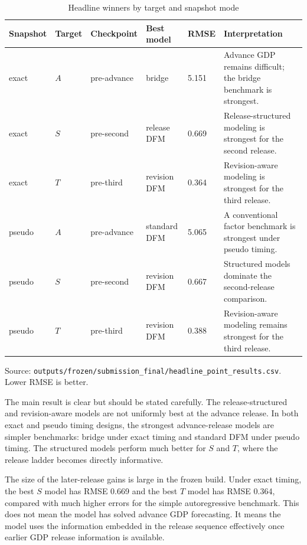 \documentclass[12pt]{article}
\begin{document}
\begin{table}[!htbp]
\centering
\begin{threeparttable}
\caption{Headline winners by target and snapshot mode}
\label{tab:headline}
\small
\begin{tabular}{lllllp{5.2cm}}
\toprule
Snapshot & Target & Checkpoint & Best model & RMSE & Interpretation \\
\midrule
exact & $A$ & pre-advance & bridge & 5.151 & Advance GDP remains difficult; the bridge benchmark is strongest. \\
exact & $S$ & pre-second & release DFM & 0.669 & Release-structured modeling is strongest for the second release. \\
exact & $T$ & pre-third & revision DFM & 0.364 & Revision-aware modeling is strongest for the third release. \\
pseudo & $A$ & pre-advance & standard DFM & 5.065 & A conventional factor benchmark is strongest under pseudo timing. \\
pseudo & $S$ & pre-second & revision DFM & 0.667 & Structured models dominate the second-release comparison. \\
pseudo & $T$ & pre-third & revision DFM & 0.388 & Revision-aware modeling remains strongest for the third release. \\
\bottomrule
\end{tabular}
\begin{tablenotes}
\footnotesize
\item Source: \texttt{outputs/frozen/submission\_final/headline\_point\_results.csv}. Lower RMSE is better.
\end{tablenotes}
\end{threeparttable}
\end{table}

The main result is clear but should be stated carefully. The release-structured and revision-aware models are not uniformly best at the advance release. In both exact and pseudo timing designs, the strongest advance-release models are simpler benchmarks: bridge under exact timing and standard DFM under pseudo timing. The structured models perform much better for $S$ and $T$, where the release ladder becomes directly informative.

The size of the later-release gains is large in the frozen build. Under exact timing, the best $S$ model has RMSE 0.669 and the best $T$ model has RMSE 0.364, compared with much higher errors for the simple autoregressive benchmark. This does not mean the model has solved advance GDP forecasting. It means the model uses the information embedded in the release sequence effectively once earlier GDP release information is available.
\end{document}
